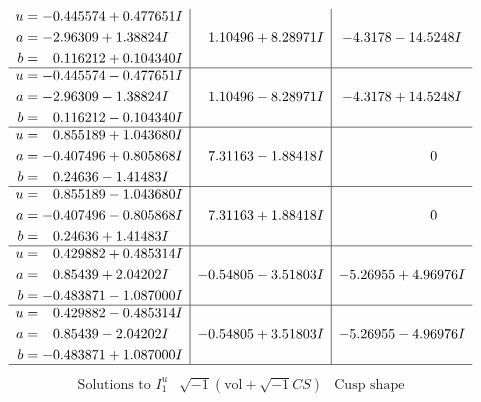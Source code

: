 \documentclass[1p]{elsarticle_modified}
\theoremstyle{definition}
\newcommand{\I}{\sqrt{-1}}
\begin{document}
$$\begin{array}{c|c|c}
\begin{aligned}
u &= -0.445574 + 0.477651 I \\
a &= -2.96309 + 1.38824 I \\
b &= \phantom{-}0.116212 + 0.104340 I\end{aligned}
 & \phantom{-}1.10496 + 8.28971 I & -4.3178 - 14.5248 I \\ \hline\begin{aligned}
u &= -0.445574 - 0.477651 I \\
a &= -2.96309 - 1.38824 I \\
b &= \phantom{-}0.116212 - 0.104340 I\end{aligned}
 & \phantom{-}1.10496 - 8.28971 I & -4.3178 + 14.5248 I \\ \hline\begin{aligned}
u &= \phantom{-}0.855189 + 1.043680 I \\
a &= -0.407496 + 0.805868 I \\
b &= \phantom{-}0.24636 - 1.41483 I\end{aligned}
 & \phantom{-}7.31163 - 1.88418 I & \phantom{-0.000000 } 0 \\ \hline\begin{aligned}
u &= \phantom{-}0.855189 - 1.043680 I \\
a &= -0.407496 - 0.805868 I \\
b &= \phantom{-}0.24636 + 1.41483 I\end{aligned}
 & \phantom{-}7.31163 + 1.88418 I & \phantom{-0.000000 } 0 \\ \hline\begin{aligned}
u &= \phantom{-}0.429882 + 0.485314 I \\
a &= \phantom{-}0.85439 + 2.04202 I \\
b &= -0.483871 - 1.087000 I\end{aligned}
 & -0.54805 - 3.51803 I & -5.26955 + 4.96976 I \\ \hline\begin{aligned}
u &= \phantom{-}0.429882 - 0.485314 I \\
a &= \phantom{-}0.85439 - 2.04202 I \\
b &= -0.483871 + 1.087000 I\end{aligned}
 & -0.54805 + 3.51803 I & -5.26955 - 4.96976 I\\
 \hline 
 \end{array}$$\newpage$$\begin{array}{c|c|c}  
\text{Solutions to }I^u_{1}& \I (\text{vol} + \sqrt{-1}CS) & \text{Cusp shape}\\
 \hline 
\begin{aligned}

\end{aligned}
\end{array}$$
\end{document}
